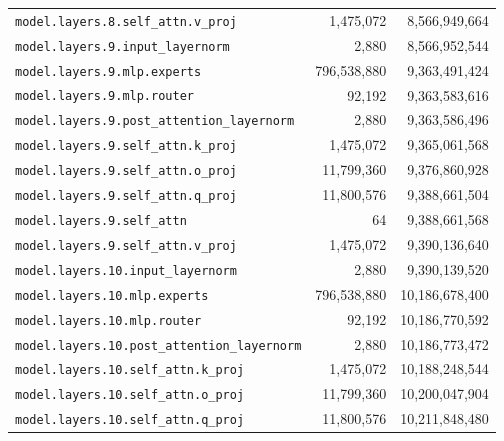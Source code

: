 \documentclass[10pt,a4paper]{article}
\theoremstyle{definition}
\begin{document}
\begin{appendices}
\begin{longtable}{p{9.5cm}rr}
\texttt{model.\allowbreak{}layers.\allowbreak{}8.\allowbreak{}self\_attn.\allowbreak{}v\_proj} & 1,475,072 & 8,566,949,664 \\
\texttt{model.\allowbreak{}layers.\allowbreak{}9.\allowbreak{}input\_layernorm} & 2,880 & 8,566,952,544 \\
\texttt{model.\allowbreak{}layers.\allowbreak{}9.\allowbreak{}mlp.\allowbreak{}experts} & 796,538,880 & 9,363,491,424 \\
\texttt{model.\allowbreak{}layers.\allowbreak{}9.\allowbreak{}mlp.\allowbreak{}router} & 92,192 & 9,363,583,616 \\
\texttt{model.\allowbreak{}layers.\allowbreak{}9.\allowbreak{}post\_attention\_layernorm} & 2,880 & 9,363,586,496 \\
\texttt{model.\allowbreak{}layers.\allowbreak{}9.\allowbreak{}self\_attn.\allowbreak{}k\_proj} & 1,475,072 & 9,365,061,568 \\
\texttt{model.\allowbreak{}layers.\allowbreak{}9.\allowbreak{}self\_attn.\allowbreak{}o\_proj} & 11,799,360 & 9,376,860,928 \\
\texttt{model.\allowbreak{}layers.\allowbreak{}9.\allowbreak{}self\_attn.\allowbreak{}q\_proj} & 11,800,576 & 9,388,661,504 \\
\texttt{model.\allowbreak{}layers.\allowbreak{}9.\allowbreak{}self\_attn} & 64 & 9,388,661,568 \\
\texttt{model.\allowbreak{}layers.\allowbreak{}9.\allowbreak{}self\_attn.\allowbreak{}v\_proj} & 1,475,072 & 9,390,136,640 \\
\texttt{model.\allowbreak{}layers.\allowbreak{}10.\allowbreak{}input\_layernorm} & 2,880 & 9,390,139,520 \\
\texttt{model.\allowbreak{}layers.\allowbreak{}10.\allowbreak{}mlp.\allowbreak{}experts} & 796,538,880 & 10,186,678,400 \\
\texttt{model.\allowbreak{}layers.\allowbreak{}10.\allowbreak{}mlp.\allowbreak{}router} & 92,192 & 10,186,770,592 \\
\texttt{model.\allowbreak{}layers.\allowbreak{}10.\allowbreak{}post\_attention\_layernorm} & 2,880 & 10,186,773,472 \\
\texttt{model.\allowbreak{}layers.\allowbreak{}10.\allowbreak{}self\_attn.\allowbreak{}k\_proj} & 1,475,072 & 10,188,248,544 \\
\texttt{model.\allowbreak{}layers.\allowbreak{}10.\allowbreak{}self\_attn.\allowbreak{}o\_proj} & 11,799,360 & 10,200,047,904 \\
\texttt{model.\allowbreak{}layers.\allowbreak{}10.\allowbreak{}self\_attn.\allowbreak{}q\_proj} & 11,800,576 & 10,211,848,480 \\

\end{longtable}
\end{appendices}
\end{document}

